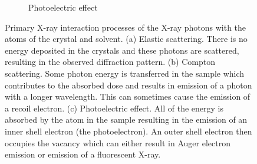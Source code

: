 \begin{figure}
\begin{subfigure}[b]{0.9\textwidth}
                    \caption{Photoelectric effect}
                    \label{fig:Photoelectric effect diagram}
            \end{subfigure}
            \caption[Primary X-ray interaction processes of X-ray photons with atoms]{Primary X-ray interaction processes of the X-ray photons with the atoms of the crystal and solvent.
                (a) Elastic scattering.
                There is no energy deposited in the crystals and these photons are scattered, resulting in the observed diffraction pattern.
                (b) Compton scattering.
                Some photon energy is transferred in the sample which contributes to the absorbed dose and results in emission of a photon with a longer wavelength.
                This can sometimes cause the emission of a recoil electron.
                (c) Photoelectric effect.
                All of the energy is absorbed by the atom in the sample resulting in the emission of an inner shell electron (the photoelectron).
                An outer shell electron then occupies the vacancy which can either result in Auger electron emission or emission of a fluorescent X-ray.}
            \label{fig:Primary absorption diagrams}
        \end{figure}

